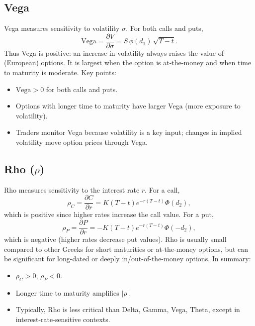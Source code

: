 \subsection{Vega}
Vega measures sensitivity to volatility \(\sigma\).  For both calls and puts,
\[
\mathrm{Vega} = \frac{\partial V}{\partial \sigma} = S\,\phi(d_1)\,\sqrt{T-t}.
\]
Thus Vega is positive: an increase in volatility always raises the value of (European) options.  It is largest when the option is at-the-money and when time to maturity is moderate.  Key points:
\begin{itemize}
    \item \(\mathrm{Vega} > 0\) for both calls and puts.
    \item Options with longer time to maturity have larger Vega (more exposure to volatility).
    \item Traders monitor Vega because volatility is a key input; changes in implied volatility move option prices through Vega.
\end{itemize}

\subsection{Rho (\(\rho\))}
Rho measures sensitivity to the interest rate \(r\).  For a call,
\[
\rho_C = \frac{\partial C}{\partial r} = K(T-t)e^{-r(T-t)}\Phi(d_2),
\]
which is positive since higher rates increase the call value.  For a put,
\[
\rho_P = \frac{\partial P}{\partial r} = -K(T-t)e^{-r(T-t)}\Phi(-d_2),
\]
which is negative (higher rates decrease put values).  Rho is usually small compared to other Greeks for short maturities or at-the-money options, but can be significant for long-dated or deeply in/out-of-the-money options.  In summary:
\begin{itemize}
    \item \(\rho_C > 0\), \(\rho_P < 0\).
    \item Longer time to maturity amplifies \(|\rho|\).
    \item Typically, Rho is less critical than Delta, Gamma, Vega, Theta, except in interest-rate-sensitive contexts.
\end{itemize}

